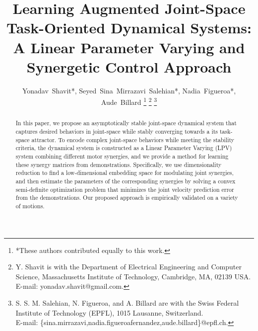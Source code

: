 \documentclass[letterpaper, 10 pt, conference,fleqn]{ieeeconf}
\begin{document}
%
\title{Learning Augmented Joint-Space Task-Oriented Dynamical Systems: \\ A
Linear Parameter Varying and Synergetic Control Approach}


%
%
\author{Yonadav~Shavit*,  Seyed~Sina~Mirrazavi~Salehian*, Nadia~Figueroa*, Aude~Billard
\thanks{*These authors contributed equally to this work.}
\thanks{Y. Shavit is with the Department
of Electrical Engineering and Computer Science, Massachusetts Institute of Technology, Cambridge,
MA, 02139 USA. E-mail: yonadav.shavit@gmail.com.}%
\thanks{S. S. M. Salehian, N. Figueroa, and A. Billard are with the Swiss Federal Institute of Technology (EPFL), 1015 Lausanne, Switzerland. \\E-mail: \{sina.mirrazavi,nadia.figueroafernandez,aude.billard\}@epfl.ch.}
}%


\maketitle
\thispagestyle{empty}
\pagestyle{empty}



\begin{abstract}
In this paper, we propose an asymptotically stable joint-space dynamical system that captures desired behaviors in joint-space while stably converging towards a its task-space attractor. %
 To encode complex joint-space behaviors while meeting the stability criteria, the dynamical system is constructed as a Linear Parameter Varying (LPV) system combining different motor synergies, and we provide a method for learning these synergy matrices from demonstrations. Specifically, we use dimensionality reduction to find a low-dimensional embedding space for modulating joint synergies, and then estimate the parameters of the corresponding synergies by solving a convex semi-definite optimization problem that minimizes the joint velocity prediction error from the demonstrations. Our proposed approach is empirically validated on a variety of motions. %
 \end{abstract}
\end{document}
